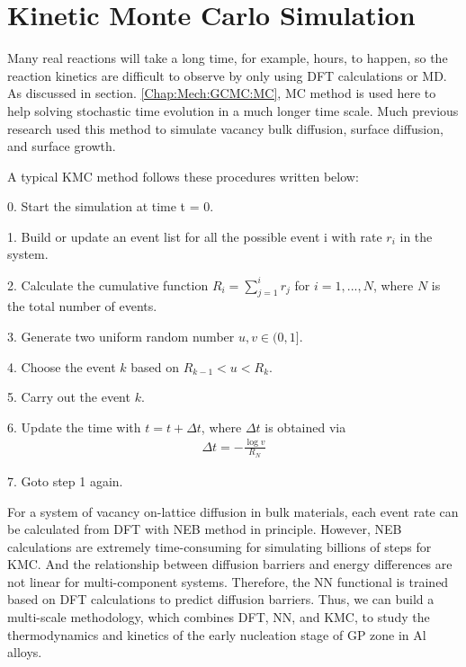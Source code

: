 \section{Kinetic Monte Carlo Simulation}
\label{Chap:Mech:KMC}

Many real reactions will take a long time, for example, hours, to happen, so the reaction kinetics are difficult to observe by only using \ac{DFT} calculations or \ac{MD}. As discussed in section. \ref{Chap:Mech:GCMC:MC}, \ac{MC} method is used here to help solving stochastic time evolution in a much longer time scale. Much previous research used this method to simulate vacancy bulk diffusion, surface diffusion, and surface growth. \cite{frenkel2001understanding, leach2001molecular}

A typical \ac{KMC} method follows these procedures written below:

0. Start the simulation at time t = 0.

1. Build or update an event list for all the possible event i with rate $r_i$ in the system.

2. Calculate the cumulative function $R_i = \sum_{j=1}^i r_j$ for $i = 1,...,N$, where $N$ is the total number of events.

3. Generate two uniform random number $u, v \in (0, 1]$.

4. Choose the event $k$ based on $R_{k-1} < u < R_k$.

5. Carry out the event $k$.

6. Update the time with $t = t + \Delta t$, where $\Delta t$ is obtained via
\begin{align}
    \Delta t = - \frac{\log{v}}{R_N}
    \label{Chap:Meth:eq:KMC:1}
\end{align}

7. Goto step 1 again.

For a system of vacancy on-lattice diffusion in bulk materials, each event rate can be calculated from \ac{DFT} with \ac{NEB} method in principle. However, \ac{NEB} calculations are extremely time-consuming for simulating billions of steps for \ac{KMC}. And the relationship between diffusion barriers and energy differences are not linear for multi-component systems. Therefore, the \ac{NN} functional is trained based on \ac{DFT} calculations to predict diffusion barriers. Thus, we can build a multi-scale methodology, which combines \ac{DFT}, \ac{NN}, and \ac{KMC}, to study the thermodynamics and kinetics of the early nucleation stage of GP zone in Al alloys.